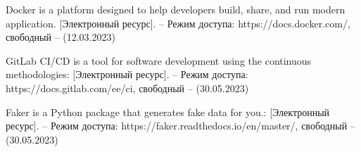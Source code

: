 \begin{thebibliography}{}
		Docker is a platform designed to help developers build, share, and run modern application. [Электронный ресурс]. -- Режим доступа: https://docs.docker.com/, свободный -- (12.03.2023)
		
		
		GitLab CI/CD is a tool for software development using the continuous methodologies: [Электронный ресурс]. -- Режим доступа: https://docs.gitlab.com/ee/ci,  свободный -- (30.05.2023)
		
		Faker is a Python package that generates fake data for you.: [Электронный ресурс]. -- Режим доступа: https://faker.readthedocs.io/en/master/,  свободный -- (30.05.2023)
	
	
	

\end{thebibliography}
\endgroup

\pagebreak
